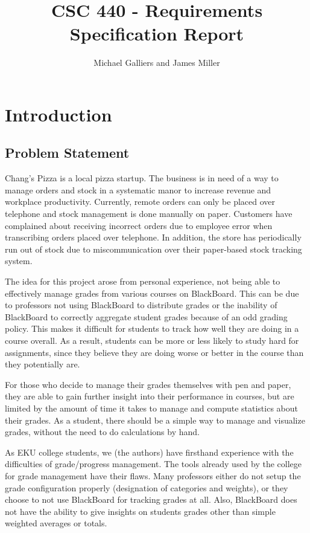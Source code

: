 \documentclass[12pt]{article}
\author{Michael Galliers and James Miller}
\title{CSC 440 - Requirements Specification Report}
\begin{document}
\begin{titlepage}
\maketitle
\end{titlepage}

\newpage
    \tableofcontents
\newpage

\section{Introduction}
\subsection{Problem Statement}
Chang’s Pizza is a local pizza startup. The business is in need of a way to manage orders and stock
in a systematic manor to increase revenue and workplace productivity. Currently, remote orders can
only be placed over telephone and stock management is done manually on paper. Customers have
complained about receiving incorrect orders due to employee error when transcribing orders placed
over telephone. In addition, the store has periodically run out of stock due to miscommunication
over their paper-based stock tracking system.


The idea for this project arose from personal experience, not being able to effectively manage
grades from various courses on BlackBoard. This can be due to professors not using BlackBoard to
distribute grades or the inability of BlackBoard to correctly aggregate student grades because of
an odd grading policy. This makes it difficult for students to track how well they are doing in a
course overall. As a result, students can be more or less likely to study hard for assignments,
since they believe they are doing worse or better in the course than they potentially are.

For those who decide to manage their grades themselves with pen and paper, they are able to gain
further insight into their performance in courses, but are limited by the amount of time it takes to
manage and compute statistics about their grades. As a student, there should be a simple way to
manage and visualize grades, without the need to do calculations by hand.


As EKU college students, we (the authors) have firsthand experience with the difficulties of
grade/progress management. The tools already used by the college for grade management have their
flaws. Many professors either do not setup the grade configuration properly (designation of
categories and weights), or they choose to not use BlackBoard for tracking grades at all. Also,
BlackBoard does not have the ability to give insights on students grades other than simple weighted
averages or totals.
\end{document}
